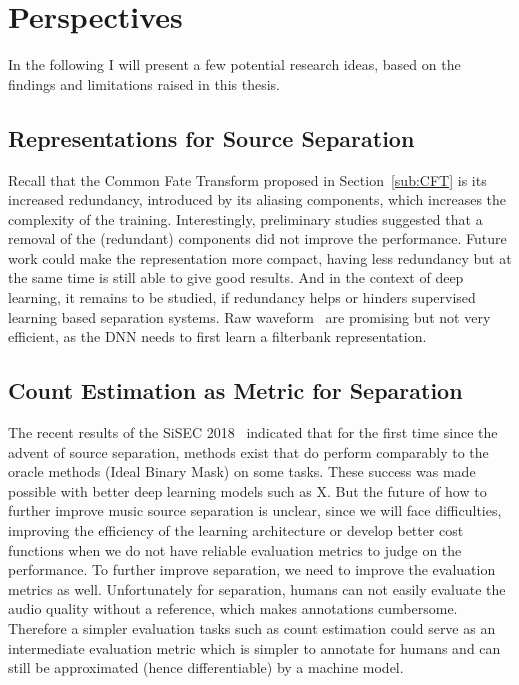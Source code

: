 \section{Perspectives}

In the following I will present a few potential research ideas, based on the findings and limitations raised in this thesis.

\subsection*{Representations for Source Separation}

Recall that the Common Fate Transform proposed in Section~\ref{sub:CFT} is its increased redundancy, introduced by its aliasing components, which increases the complexity of the training.
Interestingly, preliminary studies suggested that a removal of the (redundant) components did not improve the performance.
Future work could make the representation more compact, having less redundancy but at the same time is still able to give good results.
And in the context of deep learning, it remains to be studied, if redundancy helps or hinders supervised learning based separation systems.
Raw waveform~\cite{Dieleman14, oord16} are promising but not very efficient, as the DNN needs to first learn a filterbank representation.

\subsection*{Count Estimation as Metric for Separation}

The recent results of the SiSEC 2018~\cite{stoeter18sisec} indicated that for the first time since the advent of source separation, methods exist that do perform comparably to the oracle methods (Ideal Binary Mask) on some tasks.
These success was made possible with better deep learning models such as X. 
But the future of how to further improve music source separation is unclear, since we will face difficulties, improving the efficiency of the learning architecture or develop better cost functions when we do not have reliable evaluation metrics to judge on the performance. 
To further improve separation, we need to improve the evaluation metrics as well. Unfortunately for separation, humans can not easily evaluate the audio quality without a reference, which makes annotations cumbersome. 
Therefore a simpler evaluation tasks such as count estimation could serve as an intermediate evaluation metric which is simpler to annotate for humans and can still be approximated (hence differentiable) by a machine model.

